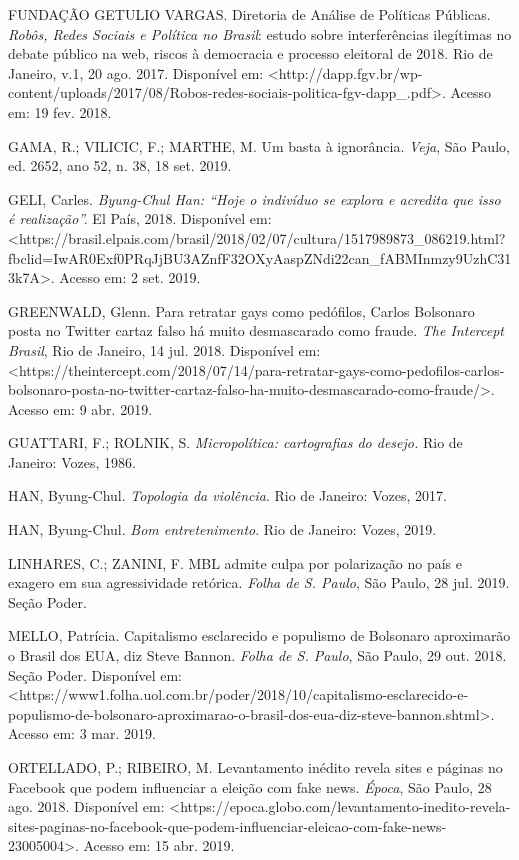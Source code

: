 FUNDAÇÃO GETULIO VARGAS. Diretoria de Análise de Políticas Públicas.
\emph{Robôs, Redes Sociais e Política no Brasil}: estudo sobre
interferências ilegítimas no debate público na web, riscos à democracia
e processo eleitoral de 2018. Rio de Janeiro, v.1, 20 ago. 2017.
Disponível em:
\textless{}http://dapp.fgv.br/wp-content/uploads/2017/08/Robos-redes-sociais-politica-fgv-dapp\_.pdf\textgreater{}.
Acesso em: 19 fev. 2018.

GAMA, R.; VILICIC, F.; MARTHE, M. Um basta à ignorância. \emph{Veja},
São Paulo, ed. 2652, ano 52, n. 38, 18 set. 2019.

GELI, Carles. \emph{Byung-Chul Han: ``Hoje o indivíduo se explora e
acredita que isso é realização''.} El País, 2018. Disponível em:
\textless{}https://brasil.elpais.com/brasil/2018/02/07/cultura/1517989873\_086219.html?fbclid=IwAR0Exf0PRqJjBU3AZnfF32OXyAaspZNdi22can\_fABMInmzy9UzhC313k7A\textgreater{}.
Acesso em: 2 set. 2019.

GREENWALD, Glenn. Para retratar gays como pedófilos, Carlos Bolsonaro
posta no Twitter cartaz falso há muito desmascarado como fraude.
\emph{The Intercept Brasil}, Rio de Janeiro, 14 jul. 2018. Disponível
em:
\textless{}https://theintercept.com/2018/07/14/para-retratar-gays-como-pedofilos-carlos-bolsonaro-posta-no-twitter-cartaz-falso-ha-muito-desmascarado-como-fraude/\textgreater{}.
Acesso em: 9 abr. 2019.

GUATTARI, F.; ROLNIK, S. \emph{Micropolítica: cartografias do desejo.}
Rio de Janeiro: Vozes, 1986.

HAN, Byung-Chul. \emph{Topologia da violência}. Rio de Janeiro: Vozes,
2017.

HAN, Byung-Chul. \emph{Bom entretenimento}. Rio de Janeiro: Vozes, 2019.

LINHARES, C.; ZANINI, F. MBL admite culpa por polarização no país e
exagero em sua agressividade retórica. \emph{Folha de S. Paulo}, São
Paulo, 28 jul. 2019. Seção Poder.

MELLO, Patrícia. Capitalismo esclarecido e populismo de Bolsonaro
aproximarão o Brasil dos EUA, diz Steve Bannon. \emph{Folha de S.
Paulo}, São Paulo, 29 out. 2018. Seção Poder. Disponível em:
\textless{}https://www1.folha.uol.com.br/poder/2018/10/capitalismo-esclarecido-e-populismo-de-bolsonaro-aproximarao-o-brasil-dos-eua-diz-steve-bannon.shtml\textgreater{}.
Acesso em: 3 mar. 2019.

ORTELLADO, P.; RIBEIRO, M. Levantamento inédito revela sites e páginas
no Facebook que podem influenciar a eleição com fake news. \emph{Época},
São Paulo, 28 ago. 2018. Disponível em:
\textless{}https://epoca.globo.com/levantamento-inedito-revela-sites-paginas-no-facebook-que-podem-influenciar-eleicao-com-fake-news-23005004\textgreater{}.
Acesso em: 15 abr. 2019.

